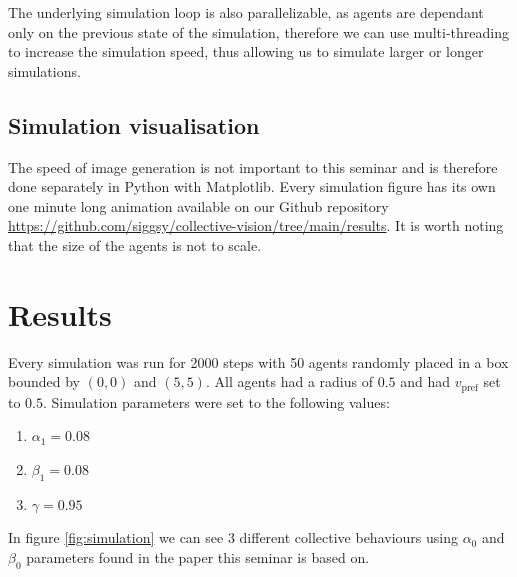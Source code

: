 \documentclass[9pt]{pnas-new}
\begin{document}
The underlying simulation loop is also parallelizable, as agents are dependant only on the previous state of the simulation, therefore we can use multi-threading to increase the simulation speed, thus allowing us to simulate larger or longer simulations.







\subsection{Simulation visualisation}

The speed of image generation is not important to this seminar and is therefore done separately in Python with Matplotlib.
Every simulation figure has its own one minute long animation available on our Github repository \url{https://github.com/siggsy/collective-vision/tree/main/results}.
It is worth noting that the size of the agents is not to scale.


\section*{Results}

Every simulation was run for 2000 steps with 50 agents randomly placed in a box bounded by $(0,0)$ and $(5,5)$.
All agents had a radius of $0.5$ and had $v_\text{pref}$ set to $0.5$.
Simulation parameters were set to the following values:
\begin{enumerate}[label=$\bullet$]
    \item $\alpha_1 = 0.08$
    \item $\beta_1 = 0.08$
    \item $\gamma = 0.95$
\end{enumerate}

In figure \ref{fig:simulation} we can see 3 different collective behaviours using $\alpha_0$ and $\beta_0$ parameters found in the paper this seminar is based on\cite{main-paper}.
\end{document}
